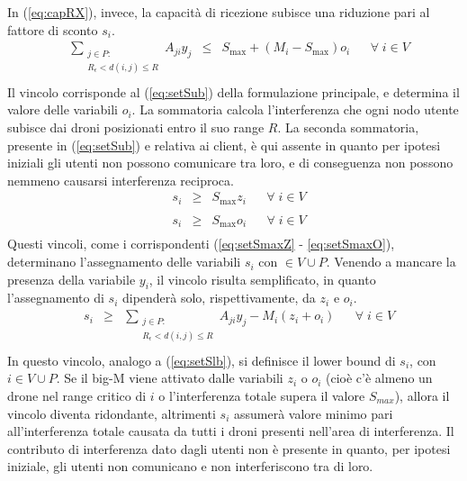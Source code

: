 In (\ref{eq:capRX}), invece, la capacità di ricezione subisce una riduzione pari al fattore di sconto $s_i$. \\
%
\begin{equation*} \label{eq:VsetSub}
	\begin{array}{rrclcl}
	& \displaystyle \sum_{\substack{j \in P :\\ R_{\epsilon} < d(i,j) \le R }} A_{ji} y_{j}  & \leq & S_{\max} + (M_i - S_{\max}) o_i %
	&& \forall \; i \in V\\
	\end{array}
\end{equation*}
%
Il vincolo corrisponde al (\ref{eq:setSub}) della formulazione principale, e determina il valore delle variabili $o_i$. La sommatoria calcola l'interferenza che ogni nodo utente subisce dai droni posizionati entro il suo range $R$. La seconda sommatoria, presente in (\ref{eq:setSub}) e relativa ai client, è qui assente in quanto per ipotesi iniziali gli utenti non possono comunicare tra loro, e di conseguenza non possono nemmeno causarsi interferenza reciproca. \\
%
\begin{equation*} \label{eq:VsetSmaxZ}
	\begin{array}{rrclcl}
	&s_{i} & \geq & S_{\max} z_{i}  && \forall \; i \in V \\
	\end{array}
\end{equation*}
%		
%
\begin{equation*} \label{eq:VsetSmaxO}
	\begin{array}{rrclcl}
	&s_{i} & \geq & S_{\max} o_{i} && \forall \; i \in V \\
	\end{array}
\end{equation*}
%
Questi vincoli, come i corrispondenti (\ref{eq:setSmaxZ} - \ref{eq:setSmaxO}), determinano l'assegnamento delle variabili $s_i$ con $\in V \cup P$. Venendo a mancare la presenza della variabile $y_i$, il vincolo risulta semplificato, in quanto l'assegnamento di $s_i$ dipenderà solo, rispettivamente, da $z_i$ e $o_i$.\\	
%
\begin{equation*} \label{eq:VsetSlb}
	\begin{array}{rrclcl}
	& s_{i} & \geq & \displaystyle \sum_{\substack{j \in P :\\ R_{\epsilon} < d(i,j) \le R} } A_{ji} y_{j}  - M_i (z_i + o_i) %
	&& \forall \; i \in V\\
	\end{array}
\end{equation*}
%
In questo vincolo, analogo a (\ref{eq:setSlb}), si definisce il lower bound di $s_i$, con $i \in V \cup P$. Se il big-M viene attivato dalle variabili $z_i$ o $o_i$ (cioè c'è almeno un drone nel range critico di $i$ o l'interferenza totale supera il valore $S_{max}$), allora il vincolo diventa ridondante, altrimenti $s_i$ assumerà valore minimo pari all'interferenza totale causata da tutti i droni presenti nell'area di interferenza. Il contributo di interferenza dato dagli utenti non è presente in quanto, per ipotesi iniziale, gli utenti non comunicano e non interferiscono tra di loro. 
			